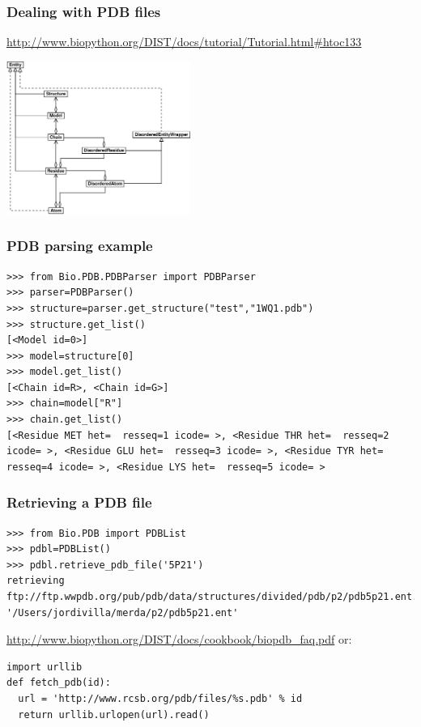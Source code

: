 \documentclass{beamer}
\begin{document}
\begin{frame}[containsverbatim]
\frametitle{Dealing with PDB files}
\footnotesize
\url{http://www.biopython.org/DIST/docs/tutorial/Tutorial.html#htoc133}
\normalsize
\begin{center}
\includegraphics[width=6cm]{smcra}
\end{center}

\end{frame}

\begin{frame}[containsverbatim]
\frametitle{PDB parsing example}
\scriptsize
\begin{lstlisting}
>>> from Bio.PDB.PDBParser import PDBParser
>>> parser=PDBParser()
>>> structure=parser.get_structure("test","1WQ1.pdb")
>>> structure.get_list()
[<Model id=0>]
>>> model=structure[0]
>>> model.get_list()
[<Chain id=R>, <Chain id=G>]
>>> chain=model["R"]
>>> chain.get_list()
[<Residue MET het=  resseq=1 icode= >, <Residue THR het=  resseq=2 icode= >, <Residue GLU het=  resseq=3 icode= >, <Residue TYR het=  resseq=4 icode= >, <Residue LYS het=  resseq=5 icode= >
\end{lstlisting}
\normalsize
\end{frame}

\begin{frame}[containsverbatim]
\frametitle{Retrieving a PDB file}
\begin{lstlisting}
>>> from Bio.PDB import PDBList
>>> pdbl=PDBList()
>>> pdbl.retrieve_pdb_file('5P21')
retrieving ftp://ftp.wwpdb.org/pub/pdb/data/structures/divided/pdb/p2/pdb5p21.ent.gz
'/Users/jordivilla/merda/p2/pdb5p21.ent'
\end{lstlisting}
\url{http://www.biopython.org/DIST/docs/cookbook/biopdb_faq.pdf}
or:
\begin{lstlisting}
import urllib
def fetch_pdb(id):
  url = 'http://www.rcsb.org/pdb/files/%s.pdb' % id
  return urllib.urlopen(url).read()
\end{lstlisting}
\end{frame}
\end{document}
